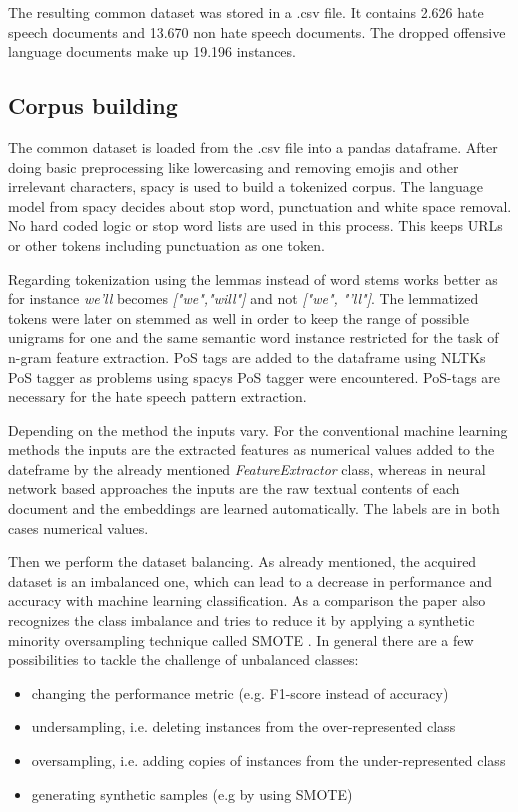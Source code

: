 The resulting common dataset was stored in a .csv file. It contains 2.626 hate speech documents and 13.670 non hate speech documents. The dropped offensive language documents make up 19.196 instances. 

\subsection{Corpus building}

The common dataset is loaded from the .csv file into a pandas dataframe. After doing basic preprocessing like lowercasing and removing emojis and other irrelevant characters, spacy is used to build a tokenized corpus. The language model from spacy decides about stop word, punctuation and white space removal. No hard coded logic or stop word lists are used in this process. This keeps URLs or other tokens including punctuation as one token. 

Regarding tokenization using the lemmas instead of word stems works better as for instance \textit{we'll} becomes \textit{["we","will"]} and not \textit{["we", "'ll"]}. The lemmatized tokens were later on stemmed as well in order to keep the range of possible unigrams for one and the same semantic word instance restricted for the task of n-gram feature extraction. PoS tags are added to the dataframe using NLTKs PoS tagger as problems using spacys PoS tagger were encountered. PoS-tags are necessary for the hate speech pattern extraction.

Depending on the method the inputs vary. For the conventional machine learning methods the inputs are the extracted features as numerical values added to the dateframe by the already mentioned \textit{Feature\-Extractor} class, whereas in neural network based approaches the inputs are the raw textual contents of each document and the embeddings are learned automatically. The labels are in both cases numerical values.

Then we perform the dataset balancing. As already mentioned, the acquired dataset is an imbalanced one, which can lead to a decrease in performance and accuracy with machine learning classification. As a comparison the paper \cite{Oriola2020} also recognizes the class imbalance and tries to reduce it by applying a synthetic minority oversampling technique called SMOTE \cite{Chawla2011}. In general there are a few possibilities to tackle the challenge of unbalanced classes:

\begin{itemize}
    \item changing the performance metric (e.g. F1-score instead of accuracy)
    \item undersampling, i.e. deleting instances from the over-represented class
    \item oversampling, i.e. adding copies of instances from the under-represented class
    \item generating synthetic samples (e.g by using SMOTE)
\end{itemize}

